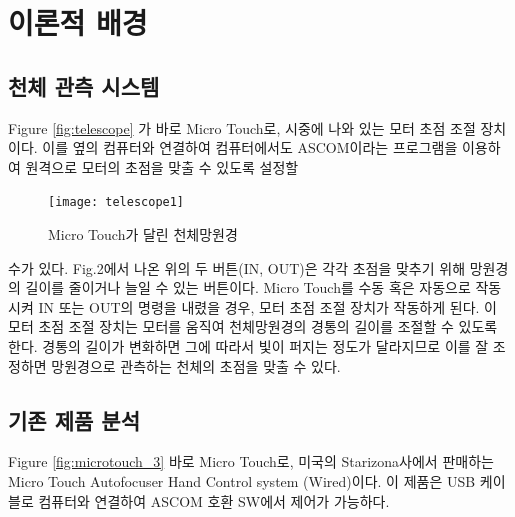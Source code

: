 \section{이론적 배경}

\subsection{천체 관측 시스템}



Figure \ref{fig:telescope} 가 바로 Micro Touch로, 시중에 나와 있는 모터 초점 조절 장치이다. 이를 옆의 컴퓨터와 연결하여 컴퓨터에서도 ASCOM이라는 프로그램을 이용하여 원격으로 모터의 초점을 맞출 수 있도록 설정할 




\begin{figure}
	\texttt{[image: telescope1]}
	\caption{Micro Touch가 달린 천체망원경}
	\label{fig:telescope1}
\end{figure}
수가 있다. Fig.2에서 나온 위의 두 버튼(IN, OUT)은 각각 초점을 맞추기 위해 망원경의 길이를 줄이거나 늘일 수 있는 버튼이다. Micro Touch를 수동 혹은 자동으로 작동시켜 IN 또는 OUT의 명령을 내렸을 경우, 모터 초점 조절 장치가 작동하게 된다. 이 모터 초점 조절 장치는 모터를 움직여 천체망원경의 경통의 길이를 조절할 수 있도록 한다. 경통의 길이가 변화하면 그에 따라서 빛이 퍼지는 정도가 달라지므로 이를 잘 조정하면 망원경으로 관측하는 천체의 초점을 맞출 수 있다.

\subsection{기존 제품 분석}

Figure \ref{fig:microtouch_3} \가 바로 Micro Touch로, 미국의 Starizona사에서 판매하는 Micro Touch Autofocuser Hand Control system (Wired)이다. 이 제품은 USB 케이블로 컴퓨터와 연결하여 ASCOM 호환 SW에서 제어가 가능하다. 

